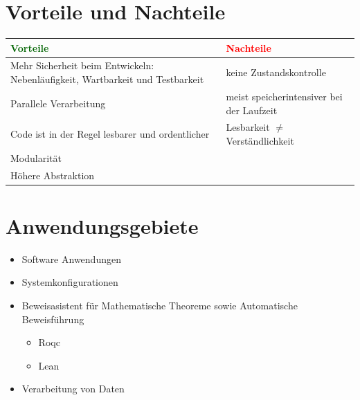 \documentclass{beamer}
\begin{document}

\section{Vorteile und Nachteile}
\begin{frame}
	\centering
	\begin{tabular}{ |p{5.5cm}|p{5cm}|  }
		\hline
		\textcolor{darkgreen}{Vorteile} & \textcolor{red}{Nachteile} \\
		\hline
		\textmd{Mehr Sicherheit beim Entwickeln: Nebenläufigkeit, Wartbarkeit und Testbarkeit} & \textmd{keine Zustandskontrolle} \\
		\hline 
		Parallele Verarbeitung &  meist speicherintensiver bei der Laufzeit  \\ 
		\hline
		Code ist in der Regel lesbarer und ordentlicher & Lesbarkeit $\neq$ Verständlichkeit \\
		\hline
		Modularität & \\ 
		\hline 
		Höhere Abstraktion & \\
		\hline
	\end{tabular}
\end{frame}

\section{Anwendungsgebiete}
\begin{frame}
	\begin{itemize}
            \item Software Anwendungen 
            \item Systemkonfigurationen 
		\item Beweisasistent für Mathematische Theoreme sowie Automatische Beweisführung
		\begin{itemize}
			\item  Roqc 
			\item  Lean 
		\end{itemize}
            \item Verarbeitung von Daten
    \end{itemize}
\end{frame}
\end{document}

